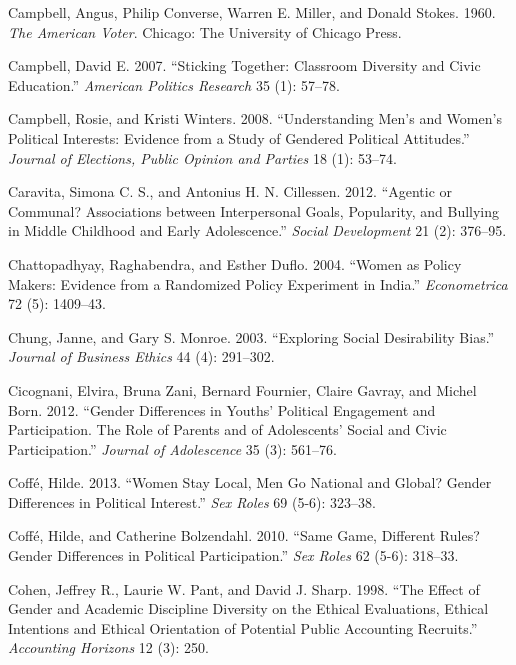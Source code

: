 \documentclass[
  letterpaper,
  DIV=11,
  numbers=noendperiod]{scrreprt}
\newlength{\cslhangindent}
\newlength{\cslentryspacingunit} %
\newenvironment{CSLReferences}[2] %
 {%
  \setlength{\parindent}{0pt}
  \ifodd #1
  \let\oldpar\par
  \def\par{\hangindent=\cslhangindent\oldpar}
  \fi
  \setlength{\parskip}{#2\cslentryspacingunit}
 }%
 {}
\begin{document}
\begin{CSLReferences}{1}{0}
\leavevmode{}%
Campbell, Angus, Philip Converse, Warren E. Miller, and Donald Stokes.
1960. \emph{{The American Voter}}. Chicago: The University of Chicago
Press.

\leavevmode{}%
Campbell, David E. 2007. {``{Sticking Together: Classroom Diversity and
Civic Education}.''} \emph{American Politics Research} 35 (1): 57--78.

\leavevmode{}%
Campbell, Rosie, and Kristi Winters. 2008. {``{Understanding Men's and
Women's Political Interests: Evidence from a Study of Gendered Political
Attitudes}.''} \emph{Journal of Elections, Public Opinion and Parties}
18 (1): 53--74.

\leavevmode{}%
Caravita, Simona C. S., and Antonius H. N. Cillessen. 2012. {``{Agentic
or Communal? Associations between Interpersonal Goals, Popularity, and
Bullying in Middle Childhood and Early Adolescence}.''} \emph{Social
Development} 21 (2): 376--95.

\leavevmode{}%
Chattopadhyay, Raghabendra, and Esther Duflo. 2004. {``{Women as Policy
Makers: Evidence from a Randomized Policy Experiment in India}.''}
\emph{Econometrica} 72 (5): 1409--43.

\leavevmode{}%
Chung, Janne, and Gary S. Monroe. 2003. {``{Exploring Social
Desirability Bias}.''} \emph{Journal of Business Ethics} 44 (4):
291--302.

\leavevmode{}%
Cicognani, Elvira, Bruna Zani, Bernard Fournier, Claire Gavray, and
Michel Born. 2012. {``{Gender Differences in Youths' Political
Engagement and Participation. The Role of Parents and of Adolescents'
Social and Civic Participation}.''} \emph{Journal of Adolescence} 35
(3): 561--76.

\leavevmode{}%
Coffé, Hilde. 2013. {``{Women Stay Local, Men Go National and Global?
Gender Differences in Political Interest}.''} \emph{Sex Roles} 69 (5-6):
323--38.

\leavevmode{}%
Coffé, Hilde, and Catherine Bolzendahl. 2010. {``{Same Game, Different
Rules? Gender Differences in Political Participation}.''} \emph{Sex
Roles} 62 (5-6): 318--33.

\leavevmode{}%
Cohen, Jeffrey R., Laurie W. Pant, and David J. Sharp. 1998. {``{The
Effect of Gender and Academic Discipline Diversity on the Ethical
Evaluations, Ethical Intentions and Ethical Orientation of Potential
Public Accounting Recruits}.''} \emph{Accounting Horizons} 12 (3): 250.


\end{CSLReferences}
\end{document}
